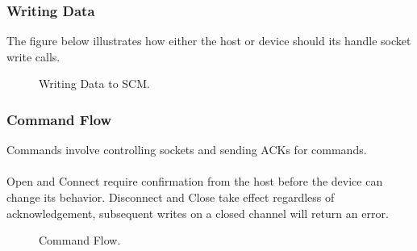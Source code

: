 \documentclass[10pt]{article}
\begin{document}
	\subsubsection{Writing Data}
	The figure below illustrates how either the host or device should its handle socket write calls. 
	\begin{figure}[H]
	\begin{center}
		\caption[Writing Data to SCM.]{Writing Data to SCM.}
		\resizebox{\linewidth}{!}{}
	\end{center}
	\end{figure}

\subsubsection{Command Flow}
Commands involve controlling sockets and sending ACKs for commands. \\
\\
Open and Connect require confirmation from the host before the device can change its behavior. Disconnect and Close take effect regardless of acknowledgement, subsequent writes on a closed channel will return an error.
\begin{figure}[H]
	\begin{center}
		\caption[Command Flow.]{Command Flow.}
		\resizebox{\linewidth}{!}{}
	\end{center}
\end{figure}
\end{document}
